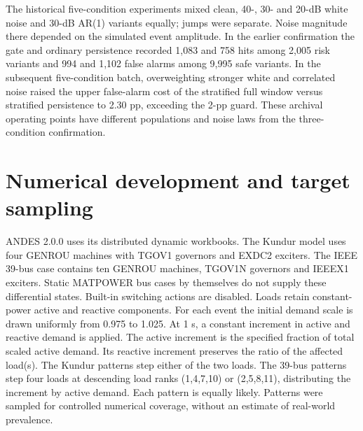 \documentclass[10pt]{article}
\begin{document}
The historical five-condition experiments mixed clean, 40-, 30- and 20-dB white noise and 30-dB AR(1) variants equally; jumps were separate. Noise magnitude there depended on the simulated event amplitude. In the earlier confirmation the gate and ordinary persistence recorded 1,083 and 758 hits among 2,005 risk variants and 994 and 1,102 false alarms among 9,995 safe variants. In the subsequent five-condition batch, overweighting stronger white and correlated noise raised the upper false-alarm cost of the stratified full window versus stratified persistence to 2.30 pp, exceeding the 2-pp guard. These archival operating points have different populations and noise laws from the three-condition confirmation.

\section{Numerical development and target sampling}
ANDES 2.0.0 uses its distributed dynamic workbooks. The Kundur model uses four GENROU machines with TGOV1 governors and EXDC2 exciters. The IEEE 39-bus case contains ten GENROU machines, TGOV1N governors and IEEEX1 exciters. Static MATPOWER bus cases by themselves do not supply these differential states. Built-in switching actions are disabled. Loads retain constant-power active and reactive components. For each event the initial demand scale is drawn uniformly from 0.975 to 1.025. At 1 s, a constant increment in active and reactive demand is applied. The active increment is the specified fraction of total scaled active demand. Its reactive increment preserves the ratio of the affected load(s). The Kundur patterns step either of the two loads. The 39-bus patterns step four loads at descending load ranks (1,4,7,10) or (2,5,8,11), distributing the increment by active demand. Each pattern is equally likely. Patterns were sampled for controlled numerical coverage, without an estimate of real-world prevalence.
\end{document}
